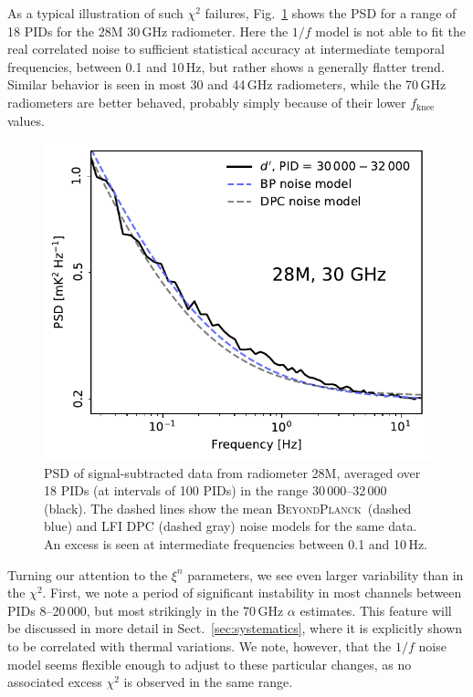 \documentclass[twocolumn]{aa}
\newcommand{\BP}{\textsc{BeyondPlanck}}
\begin{document}
As a typical illustration of such $\chi^2$ failures,
Fig.~\ref{fig:ps_compare_28M} shows the PSD for a range of 18 PIDs for
the 28M 30\,GHz radiometer. Here the $1/f$ model is
not able to fit the real correlated noise to sufficient statistical
accuracy at intermediate temporal frequencies, between 0.1 and 10\,Hz,
but rather shows a generally flatter trend. Similar behavior is seen
in most 30 and 44\,GHz radiometers, while the 70\,GHz radiometers
are better behaved, probably simply because of their lower
$f_{\mathrm{knee}}$ values.

\begin{figure}
	\begin{center}
		\includegraphics[width=\linewidth]{figs/ps_running_mean_28M.pdf}
	\end{center}
	\caption{PSD of signal-subtracted data from radiometer 28M,
          averaged over 18 PIDs (at intervals of 100 PIDs) in the range 30\,000--32\,000
          (black). The dashed lines show the mean \BP\ (dashed blue)
          and LFI DPC (dashed gray) noise models for the same data. An
          excess is seen at intermediate frequencies between 0.1
          and 10\,Hz.
		\label{fig:ps_compare_28M}}
\end{figure}

Turning our attention to the $\xi^n$ parameters, we see even larger
variability than in the $\chi^2$. First, we note a period of
significant instability in most channels between PIDs 8--20\,000, but
most strikingly in the 70\,GHz $\alpha$ estimates. This feature will be
discussed in more detail in Sect.~\ref{sec:systematics}, where it is
explicitly shown to be correlated with thermal variations. We note,
however, that the $1/f$ noise model seems flexible enough to adjust to
these particular changes, as no associated excess $\chi^2$ is observed
in the same range.
\end{document}
